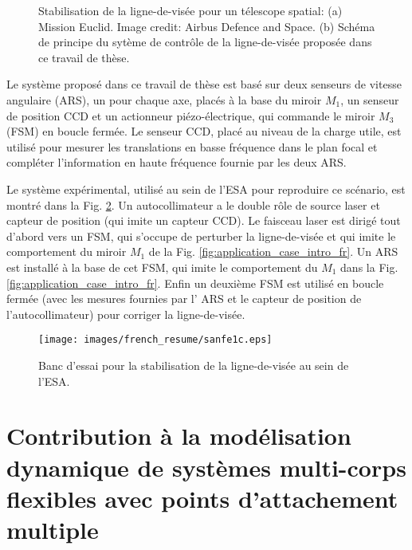 \begin{figure}[!h]%
    \centering
    \qquad
    \caption{Stabilisation de la ligne-de-vis\'ee pour un t\'elescope spatial: (a) Mission Euclid. Image credit: Airbus Defence and Space. (b) Sch\'ema de principe du syt\`eme de contr\^ole de la ligne-de-vis\'ee propos\'ee dans ce travail de th\`ese.}%
    \label{fig:applic_fr}%
\end{figure}

Le syst\`eme propos\'e dans ce travail de th\`ese est bas\'e sur deux senseurs de vitesse angulaire (ARS), un pour chaque axe, plac\'es \`a la base du miroir $M_1$, un senseur de position CCD et un actionneur pi\'ezo-\'electrique, qui commande le miroir $M_3$ (FSM) en boucle ferm\'ee. Le senseur CCD, plac\'e au niveau de la charge utile, est utilis\'e pour mesurer les translations en basse fr\'equence dans le plan focal et compl\'eter l'information en haute fr\'equence fournie par les deux ARS.

Le syst\`eme exp\'erimental, utilis\'e au sein de l'ESA pour reproduire ce sc\'enario, est montr\'e dans la Fig. \ref{fig:experimental_setup_intro_fr}. Un autocollimateur a le double rôle de source laser et capteur de position (qui imite un capteur CCD). Le faisceau laser est dirig\'e tout d'abord vers un FSM, qui s'occupe de perturber la ligne-de-vis\'ee et qui imite le comportement du miroir $M_1$ de la Fig. \ref{fig:application_case_intro_fr}. Un ARS est install\'e \`a la base de cet FSM, qui imite le comportement du $M_1$ dans la Fig. \ref{fig:application_case_intro_fr}. Enfin un deuxi\`eme FSM est utilis\'e en boucle ferm\'ee (avec les mesures fournies par l' ARS et le capteur de position de l'autocollimateur) pour corriger la ligne-de-vis\'ee.     

\begin{figure}[th!]
	\centering
	\texttt{[image: images/french\_resume/sanfe1c.eps]}
	\caption{Banc d'essai pour la stabilisation de la ligne-de-vis\'ee au sein de l'ESA.}	\label{fig:experimental_setup_intro_fr}
\end{figure}

\section[Mod\'elisation dynamique de syst\`emes multi-corps flexibles]{Contribution \`a la mod\'elisation dynamique de syst\`emes multi-corps flexibles avec points d'attachement multiple}

